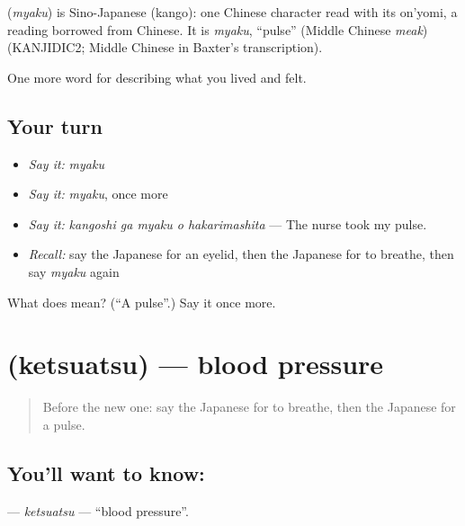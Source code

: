 \begin{cousinweb}
\textbf{} (\emph{myaku}) is Sino-Japanese (kango): one Chinese character read with its on'yomi, a reading borrowed from Chinese. It is \emph{myaku}, \textquotedblleft{}pulse\textquotedblright{} (Middle Chinese \emph{meak}) (KANJIDIC2; Middle Chinese in Baxter's transcription).
\end{cousinweb}

\begin{grammarlens}[title={What you've built}]
One more word for describing what you lived and felt.
\end{grammarlens}

\subsection*{Your turn}
\begin{itemize}
\raggedright
  \item \emph{Say it:} \emph{myaku}
  \item \emph{Say it:} \emph{myaku}, once more
  \item \emph{Say it:} \emph{kangoshi ga myaku o hakarimashita} — The nurse took my pulse.
  \item \emph{Recall:} say the Japanese for an eyelid, then the Japanese for to breathe, then say \emph{myaku} again
\end{itemize}

\begin{tcolorbox}[breakable,colback=teal!4,colframe=teal!35!black,title={Before you move on}]
What does  mean? (\textquotedblleft{}A pulse\textquotedblright{}.) Say it once more.
\end{tcolorbox}
\section[\texorpdfstring{\ja{けつあつ} (ketsuatsu)}{けつあつ (ketsuatsu)}]{ (ketsuatsu) — blood pressure}

\label{lesson:JA-C444-ketsuatsu}



\begin{quote}
Before the new one: say the Japanese for to breathe, then the Japanese for a pulse.
\end{quote}

\subsection*{You'll want to know: }
\textbf{} — \emph{ketsuatsu} — \textquotedblleft{}blood pressure\textquotedblright{}.

